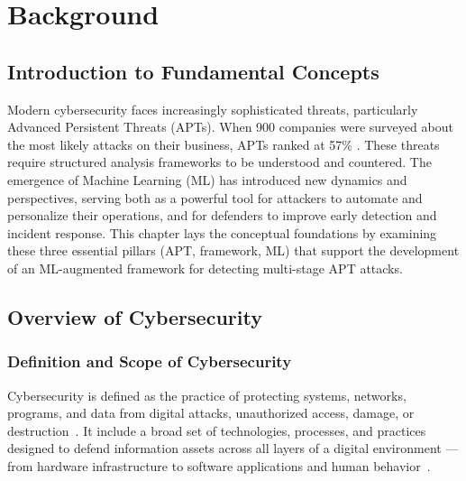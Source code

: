 \chapter{Background}
\label{chap:background}

\section{Introduction to Fundamental Concepts}
Modern cybersecurity faces increasingly sophisticated threats, particularly Advanced Persistent Threats (APTs). When 900 companies were surveyed about the most likely attacks on their business, APTs ranked at 57\% \cite{aag2024stats}. These threats require structured analysis frameworks to be understood and countered. The emergence of Machine Learning (ML) has introduced new dynamics and perspectives, serving both as a powerful tool for attackers to automate and personalize their operations, and for defenders to improve early detection and incident response. This chapter lays the conceptual foundations by examining these three essential pillars (APT, framework, ML) that support the development of an ML-augmented framework for detecting multi-stage APT attacks.

\section{Overview of Cybersecurity}

\subsection{Definition and Scope of Cybersecurity}
Cybersecurity is defined as the practice of protecting systems, networks, programs, and data from digital attacks, unauthorized access, damage, or destruction~\cite{cains2022cybersecurity,nist2023cyber}. It include a broad set of technologies, processes, and practices designed to defend information assets across all layers of a digital environment --- from hardware infrastructure to software applications and human behavior~\cite{cisco2024cyber}.

